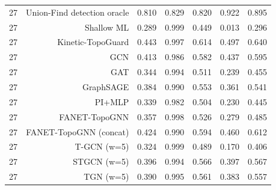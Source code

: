 \begin{tabular}{lrrrrrr}
27 & Union-Find detection oracle & 0.810 & 0.829 & 0.820 & 0.922 & 0.895 \\
27 & Shallow ML & 0.289 & 0.999 & 0.449 & 0.013 & 0.296 \\
27 & Kinetic-TopoGuard & 0.443 & 0.997 & 0.614 & 0.497 & 0.640 \\
27 & GCN & 0.413 & 0.986 & 0.582 & 0.437 & 0.595 \\
27 & GAT & 0.344 & 0.994 & 0.511 & 0.239 & 0.455 \\
27 & GraphSAGE & 0.384 & 0.990 & 0.553 & 0.361 & 0.541 \\
27 & PI+MLP & 0.339 & 0.982 & 0.504 & 0.230 & 0.445 \\
27 & FANET-TopoGNN & 0.357 & 0.998 & 0.526 & 0.279 & 0.485 \\
27 & FANET-TopoGNN (concat) & 0.424 & 0.990 & 0.594 & 0.460 & 0.612 \\
27 & T-GCN (w=5) & 0.324 & 0.999 & 0.489 & 0.170 & 0.406 \\
27 & STGCN (w=5) & 0.396 & 0.994 & 0.566 & 0.397 & 0.567 \\
27 & TGN (w=5) & 0.390 & 0.995 & 0.561 & 0.383 & 0.557 \\
\bottomrule
\end{tabular}
